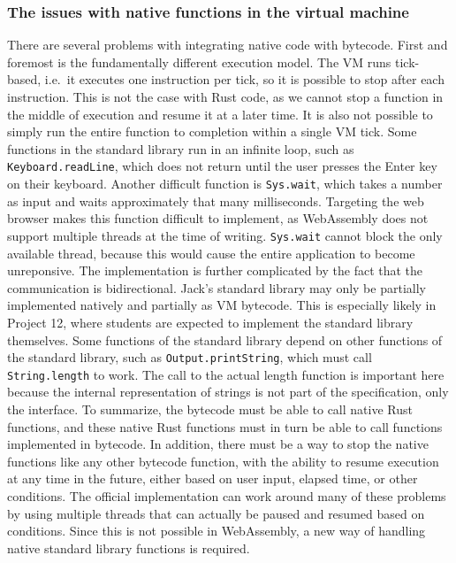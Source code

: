\subsubsection{The issues with native functions in the virtual machine} \label{stdlib-issues}
There are several problems with integrating native code with bytecode.
First and foremost is the fundamentally different execution model.
The VM runs tick-based, i.e.\ it executes one instruction per tick, so it is possible to stop after each instruction.
This is not the case with Rust code, as we cannot stop a function in the middle of execution and resume it at a later time.
It is also not possible to simply run the entire function to completion within a single VM tick.
Some functions in the standard library run in an infinite loop, such as \verb+Keyboard.readLine+, which does not return until the user presses the Enter key on their keyboard.
Another difficult function is \verb+Sys.wait+, which takes a number as input and waits approximately that many milliseconds.
Targeting the web browser makes this function difficult to implement, as WebAssembly does not support multiple threads at the time of writing.
\verb+Sys.wait+ cannot block the only available thread, because this would cause the entire application to become unreponsive.
The implementation is further complicated by the fact that the communication is bidirectional.
Jack's standard library may only be partially implemented natively and partially as VM bytecode.
This is especially likely in Project 12, where students are expected to implement the standard library themselves.
Some functions of the standard library depend on other functions of the standard library, such as \verb+Output.printString+, which must call \verb+String.length+ to work.
The call to the actual length function is important here because the internal representation of strings is not part of the specification, only the interface.
To summarize, the bytecode must be able to call native Rust functions, and these native Rust functions must in turn be able to call functions implemented in bytecode.
In addition, there must be a way to stop the native functions like any other bytecode function, with the ability to resume execution at any time in the future, either based on user input, elapsed time, or other conditions.
The official implementation can work around many of these problems by using multiple threads that can actually be paused and resumed based on conditions.
Since this is not possible in WebAssembly, a new way of handling native standard library functions is required.


